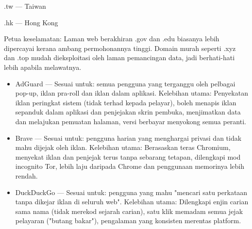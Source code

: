 .tw — Taiwan

.hk — Hong Kong

Petua keselamatan: Laman web berakhiran .gov dan .edu biasanya lebih dipercayai kerana ambang permohonannya tinggi. Domain murah seperti .xyz dan .top mudah dieksploitasi oleh laman pemancingan data, jadi berhati-hati lebih apabila melawatnya.


\begin{itemize}
  \item AdGuard — Sesuai untuk: semua pengguna yang terganggu oleh pelbagai pop-up, iklan pra-roll dan iklan dalam aplikasi. Kelebihan utama: Penyekatan iklan peringkat sistem (tidak terhad kepada pelayar), boleh menapis iklan sepanduk dalam aplikasi dan penjejakan skrin pembuka, menjimatkan data dan melajukan pemuatan halaman, versi berbayar menyokong semua peranti.
\end{itemize}


\begin{itemize}
  \item Brave — Sesuai untuk: pengguna harian yang menghargai privasi dan tidak mahu dijejak oleh iklan. Kelebihan utama: Berasaskan teras Chromium, menyekat iklan dan penjejak terus tanpa sebarang tetapan, dilengkapi mod incognito Tor, lebih laju daripada Chrome dan penggunaan memorinya lebih rendah.
  \item DuckDuckGo — Sesuai untuk: pengguna yang mahu "mencari satu perkataan tanpa dikejar iklan di seluruh web". Kelebihan utama: Dilengkapi enjin carian sama nama (tidak merekod sejarah carian), satu klik memadam semua jejak pelayaran ("butang bakar"), pengalaman yang konsisten merentas platform.
\end{itemize}


